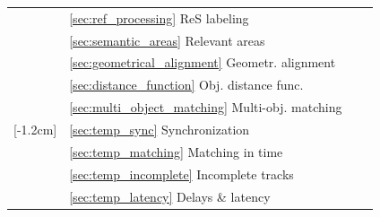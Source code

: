 \documentclass[conference]{IEEEtran}
\begin{document}
\begin{table}[htbp]
\begin{threeparttable}
\begin{tabularx}{\linewidth}{
			>{\hsize=0.02\hsize}X
			>{\hsize=0.38\hsize}X 
			>{\hsize=0.8\hsize}X 
			>{\hsize=0.8\hsize}X 
		}
		                                                                                        & \ref{sec:ref_processing} ReS labeling               & \basicChallengeReSLabling            & \basicDroneReSLabling                                                           \\ \cline{2-4}
		                                                                                        & \ref{sec:semantic_areas} Relevant areas             & \basicChallengeAreas                 & \basicDroneAreas                                                                \\ \cline{2-4}
		                                                                                        & \ref{sec:geometrical_alignment} Geometr. alignment  & \basicChallengeGeometrAlign          & \basicDroneGeometrAlign                                                         \\ \cline{2-4}
		                                                                                        & \ref{sec:distance_function} Obj. distance func.     & \basicChallengeObjDistance           & \basicDroneObjDistance                                                          \\ \cline{2-4}
		                                                                                        & \ref{sec:multi_object_matching} Multi-obj. matching & \basicChallengeMultiObjMatching      & \basicDroneMultiObjMatching                                                     \\ \midrule
		\parbox[t]{2mm}{[-1.2cm]{}}            & \ref{sec:temp_sync} Synchronization                 & \tempChallengeSync                   & \tempDroneSync                                                                  \\ 
		                                                                                        & \ref{sec:temp_matching} Matching in time                    & \tempChallengeMatching               & \tempDroneMatching                                                              \\ 
		                                                                                        & \ref{sec:temp_incomplete} Incomplete tracks         & \tempChallengeIncomplete             & \tempDroneIncomplete                                                            \\ 
		                                                                                        & \ref{sec:temp_latency} Delays \& latency            & \tempChallengeDelays                 & \tempDroneDelays                                                                \\ \midrule

\end{tabularx}
\end{threeparttable}
\end{table}
\end{document}
